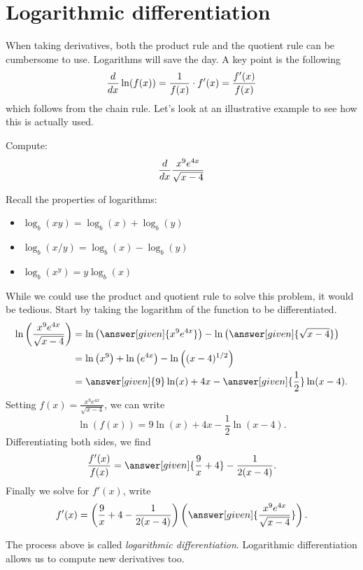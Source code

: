 \documentclass{ximera}
\begin{document}
	
	\section{Logarithmic differentiation}
	
	
	When taking derivatives, both the product rule and the quotient rule
	can be cumbersome to use. Logarithms will save the day. A key point is
	the following
	\[
	\frac{d}{\mathop{}\!d x} \ln(f(x)) = \frac{1}{f(x)}\cdot f'(x) = \frac{f'(x)}{f(x)}
	\]
	which follows from the chain rule. Let's look at an illustrative
	example to see how this is actually used.
	
	\begin{example} 
		Compute:
		\[
		\frac{d}{\mathop{}\!d x} \frac{x^9e^{4x}}{\sqrt{x-4}}
		\]
		\begin{explanation}
			Recall the properties of logarithms:
			\begin{itemize}
				\item $\log_b(xy) = \log_b(x) + \log_b(y)$
				\item $\log_b(x/y) = \log_b(x) - \log_b(y)$
				\item $\log_b(x^y) = y\log_b(x)$
			\end{itemize}
			
			While we could use the product and quotient rule to solve this
			problem, it would be tedious. Start by taking the logarithm of the
			function to be differentiated.
			\begin{align*}
				\ln\left(\frac{x^9e^{4x}}{\sqrt{x-4}} \right) &= \ln\left(\answer[given]{x^9e^{4x}}\right) - \ln\left(\answer[given]{\sqrt{x-4}}\right)\\
				&= \ln\left(x^9\right)+\ln\left(e^{4x}\right) - \ln\left((x-4)^{1/2}\right)\\
				&= \answer[given]{9}\ln(x)+4x - \answer[given]{\frac{1}{2}}\ln(x-4).
			\end{align*}
			Setting $f(x) = \frac{x^9e^{4x}}{\sqrt{x-4}}$, we can write
			\[
			\ln(f(x)) = 9\ln(x)+4x - \frac{1}{2}\ln(x-4).
			\]
			Differentiating both sides, we find
			\[
			\frac{f'(x)}{f(x)} = \answer[given]{\frac{9}{x}+4} - \frac{1}{2(x-4)}.
			\]
			Finally we solve for $f'(x)$, write
			\[
			f'(x) = \left(\frac{9}{x}+4 - \frac{1}{2(x-4)}\right)\left(\answer[given]{\frac{x^9e^{4x}}{\sqrt{x-4}}}\right).
			\]
		\end{explanation}
	\end{example}
	
	The process above is called \textit{logarithmic
		differentiation}. Logarithmic differentiation allows us to compute
	new derivatives too.
	
\end{document}
